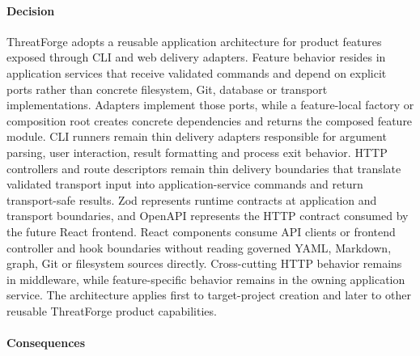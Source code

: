 \documentclass[
  10pt,
]{article}
\begin{document}
\paragraph{Decision}\label{decision-30}

ThreatForge adopts a reusable application architecture for product
features exposed through CLI and web delivery adapters. Feature behavior
resides in application services that receive validated commands and
depend on explicit ports rather than concrete filesystem, Git, database
or transport implementations. Adapters implement those ports, while a
feature-local factory or composition root creates concrete dependencies
and returns the composed feature module. CLI runners remain thin
delivery adapters responsible for argument parsing, user interaction,
result formatting and process exit behavior. HTTP controllers and route
descriptors remain thin delivery boundaries that translate validated
transport input into application-service commands and return
transport-safe results. Zod represents runtime contracts at application
and transport boundaries, and OpenAPI represents the HTTP contract
consumed by the future React frontend. React components consume API
clients or frontend controller and hook boundaries without reading
governed YAML, Markdown, graph, Git or filesystem sources directly.
Cross-cutting HTTP behavior remains in middleware, while
feature-specific behavior remains in the owning application service. The
architecture applies first to target-project creation and later to other
reusable ThreatForge product capabilities.

\paragraph{Consequences}\label{consequences-30}
\end{document}
